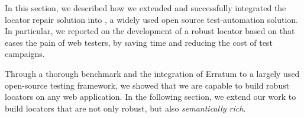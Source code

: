 In this section, we described how we extended and successfully integrated the locator repair solution \erratum into \cerberus, a widely used open source test-automation solution.
In particular, we reported on the development of a robust locator based on \erratum that eases the pain of web testers, by saving time and reducing the cost of test campaigns.

Through a thorough benchmark and the integration of Erratum to a largely used open-source testing framework, we showed that we are capable to build robust locators on any web application.
In the following section, we extend our work to build locators that are not only robust, but also \textit{semantically rich}.